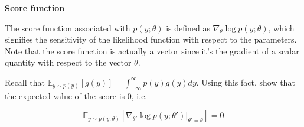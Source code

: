 \item {} \textbf{Score function}

The score function associated with $p(y;\theta)$ is defined as $\nabla_{\theta}\log p(y;\theta)$, which signifies the sensitivity of the likelihood function with respect to the parameters. Note that the score function is actually a vector since it's the gradient of a scalar quantity with respect to the vector $\theta$. 

Recall that $\mathbb{E}_{y\sim p(y)}[g(y)]=\int_{-\infty}^{\infty}p(y)g(y)dy$. Using this fact, show that the expected value of the score is 0, i.e. 

$$\mathbb{E}_{y\sim p(y;\theta)}[\nabla_{\theta'} \log p(y;\theta')|_{\theta'=\theta}]=0$$


\ifnum{} {
  
} \fi
